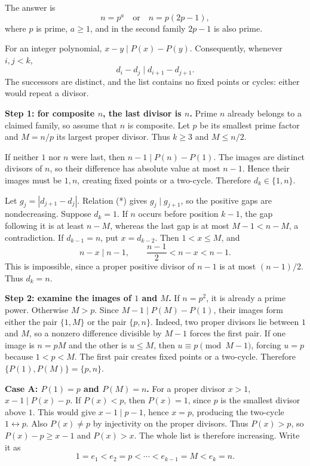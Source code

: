 \documentclass[12pt]{memoir}
\begin{document}
\newpage
\begin{Ej}
The answer is
\[
    \boxed{n=p^a\quad\text{or}\quad n=p(2p-1),}
\]
where \(p\) is prime, \(a\geq1\), and in the second family
\(2p-1\) is also prime.

For an integer polynomial, \(x-y\mid P(x)-P(y)\).
Consequently, whenever \(i,j<k\),
\begin{equation*}
    d_i-d_j\mid d_{i+1}-d_{j+1}. \tag{*}
\end{equation*}
The successors are distinct, and the list contains no fixed points
or cycles: either would repeat a divisor.

\textbf{Step 1: for composite \(n\), the last divisor is \(n\).}
Prime \(n\) already belongs to a claimed family, so assume that \(n\)
is composite. Let \(p\) be its smallest prime factor and \(M=n/p\)
its largest proper divisor. Thus \(k\geq3\) and \(M\leq n/2\).

If neither \(1\) nor \(n\) were last, then
\(n-1\mid P(n)-P(1)\). The images are distinct divisors of \(n\),
so their difference has absolute value at most \(n-1\). Hence their
images must be \(1,n\), creating fixed points or a two-cycle.
Therefore \(d_k\in\{1,n\}\).

Let \(g_j=|d_{j+1}-d_j|\). Relation (*) gives
\(g_j\mid g_{j+1}\), so the positive gaps are nondecreasing.
Suppose \(d_k=1\). If \(n\) occurs before position \(k-1\), the
gap following it is at least \(n-M\), whereas the last gap is at most
\(M-1<n-M\), a contradiction.
If \(d_{k-1}=n\), put \(x=d_{k-2}\). Then \(1<x\leq M\), and
\[
    n-x\mid n-1,\qquad \frac{n-1}{2}<n-x<n-1.
\]
This is impossible, since a proper positive divisor of \(n-1\) is
at most \((n-1)/2\). Thus \(d_k=n\).

\textbf{Step 2: examine the images of \(1\) and \(M\).}
If \(n=p^2\), it is already a prime power. Otherwise \(M>p\).
Since \(M-1\mid P(M)-P(1)\), their images form either the pair
\(\{1,M\}\) or the pair \(\{p,n\}\). Indeed, two proper divisors
lie between \(1\) and \(M\), so a nonzero difference divisible by
\(M-1\) forces the first pair. If one image is \(n=pM\) and the
other is \(u\leq M\), then \(u\equiv p\pmod{M-1}\), forcing
\(u=p\) because \(1<p<M\).
The first pair creates fixed points or a two-cycle. Therefore
\(\{P(1),P(M)\}=\{p,n\}\).

\textbf{Case A: \(P(1)=p\) and \(P(M)=n\).}
For a proper divisor \(x>1\),
\(x-1\mid P(x)-p\). If \(P(x)<p\), then \(P(x)=1\), since
\(p\) is the smallest divisor above \(1\). This would give
\(x-1\mid p-1\), hence \(x=p\), producing the two-cycle
\(1\leftrightarrow p\). Also \(P(x)\ne p\) by injectivity on
the proper divisors. Thus \(P(x)>p\), so
\(P(x)-p\geq x-1\) and \(P(x)>x\).
The whole list is therefore increasing. Write it as
\[
    1=e_1<e_2=p<\cdots<e_{k-1}=M<e_k=n.
\]


\end{Ej}
\end{document}
